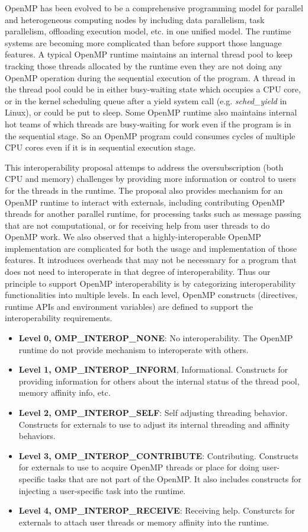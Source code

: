 OpenMP has been evolved to be a comprehensive programming model for parallel and heterogeneous computing nodes by including 
data parallelism, task parallelism, offloading execution model, etc. in one unified model. 
The runtime systems are becoming more complicated than before support those language features.
A typical OpenMP runtime maintains an internal thread pool to keep tracking those threads allocated by the runtime even they are not  
doing any OpenMP operation during the sequential execution of the program. 
A thread in the thread pool could be in either busy-waiting state which occupies a CPU core, or in the kernel
scheduling queue after a yield system call (e.g. {\em sched\_yield} in Linux), or could be put to sleep. Some OpenMP runtime also maintains
internal hot teams of which threads are busy-waiting for work even if the program is in the sequential stage. So an OpenMP program could 
consumes cycles of multiple CPU cores even if it is in sequential execution stage.

This interoperability proposal attemps to address the oversubscription (both CPU and memory) challenges by providing more information or control
to users for the threads in the runtime. The proposal also provides mechanism for an OpenMP runtime to interact with externals, including 
contributing OpenMP threads for another parallel runtime, for processing tasks such as message passing that are not computational, or for receiving
help from user threads to do OpenMP work. We also observed that a highly-interoperable OpenMP implementation are 
complicated for both the usage and implementation of those features. It introduces
overheads that may not be necessnary for a program that does not need to interoperate in that degree of interoperability. 
Thus our principle to support OpenMP interoperability is by 
categorizing interoperability functionalities into multiple levels. In each level, 
OpenMP constructs (directives, runtime APIs and environment variables) are defined to support the interoperability 
requirements. 
\begin{itemize}
	\item {\bf Level 0, OMP\_INTEROP\_NONE}: No interoperability. The OpenMP runtime do not provide mechanism to interoperate with others.
	\item {\bf Level 1, OMP\_INTEROP\_INFORM}, Informational. Constructs for providing information for others about the internal status of the thread pool, memory affinity info, etc. 
	\item {\bf Level 2, OMP\_INTEROP\_SELF}: Self adjusting threading behavior. Constructs for
		externals to use to adjust its internal threading and affinity behaviors.
	\item {\bf Level 3, OMP\_INTEROP\_CONTRIBUTE}: Contributing. Constructs for externals to use to acquire OpenMP 
		threads or place for doing user-specific tasks that are not part of the OpenMP. It also includes constructs for injecting
		a user-specific task into the runtime. 
	\item {\bf Level 4, OMP\_INTEROP\_RECEIVE}: Receiving help. Consturcts for externals to attach user threads or memory affinity into the runtime.
\end{itemize}

